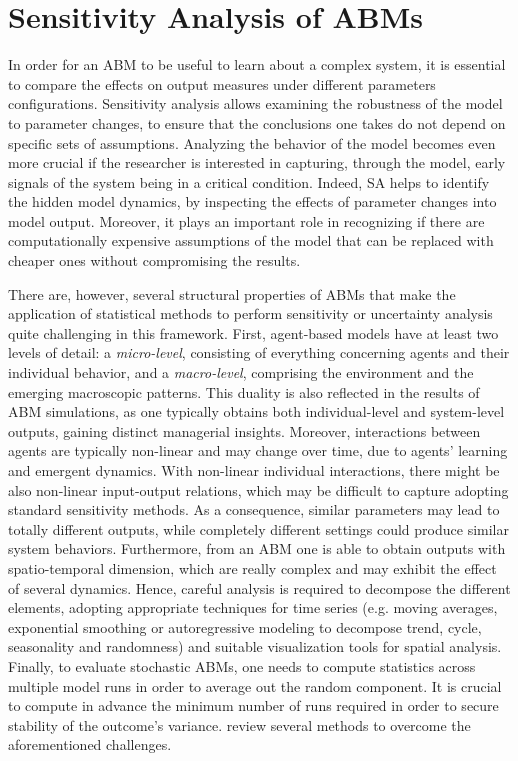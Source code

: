 \section{Sensitivity Analysis of ABMs} \label{sa-abm}



In order for an ABM to be useful to learn about a complex system, it is essential to compare the effects on output measures under different parameters configurations. Sensitivity analysis allows examining the robustness of the model to parameter changes, to ensure that the conclusions one takes do not depend on specific sets of assumptions. Analyzing the behavior of the model becomes even more crucial if the researcher is interested in capturing, through the model, early signals of the system being in a critical condition. Indeed, SA helps to identify the hidden model dynamics, by inspecting the effects of parameter changes into model output. Moreover, it plays an important role in recognizing if there are computationally expensive assumptions of the model that can be replaced with cheaper ones without compromising the results.  

There are, however, several structural properties of ABMs that make the application of statistical methods to perform sensitivity or uncertainty analysis quite challenging in this framework. First, agent-based models have at least two levels of detail: a \textit{micro-level}, consisting of everything concerning agents and their individual behavior, and a \textit{macro-level}, comprising the environment and the emerging macroscopic patterns. This duality is also reflected in the results of ABM simulations, as one typically obtains both individual-level and system-level outputs, gaining distinct managerial insights. Moreover, interactions between agents are typically non-linear and may change over time, due to agents' learning and emergent dynamics. With non-linear individual interactions, there might be also non-linear input-output relations, which may be difficult to capture adopting standard sensitivity methods. As a consequence, similar parameters may lead to totally different outputs, while completely different settings could produce similar system behaviors. Furthermore, from an ABM one is able to obtain outputs with spatio-temporal dimension, which are really complex and may exhibit the effect of several dynamics. Hence, careful analysis is required to decompose the different elements, adopting appropriate techniques for time series (e.g. moving averages, exponential smoothing or autoregressive modeling to decompose trend, cycle, seasonality and randomness) and suitable visualization tools for spatial analysis. Finally, to evaluate stochastic ABMs, one needs to compute statistics across multiple model runs in order to average out the random component. It is crucial to compute in advance the minimum number of runs required in order to secure stability of the outcome's variance. \textcite{Lee2015TheCO} review several methods to overcome the aforementioned challenges. 

